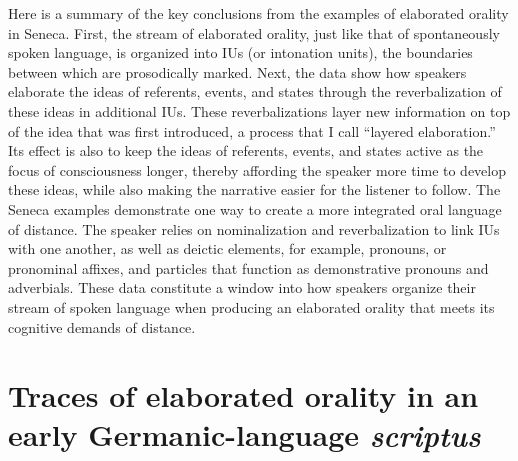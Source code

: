 Here is a summary of the key conclusions from the examples of elaborated orality in Seneca. First, the stream of elaborated orality, just like that of spontaneously spoken language, is organized into IUs (or intonation units), the boundaries between which are prosodically marked. Next, the data show how speakers elaborate the ideas of referents, events, and states through the reverbalization of these ideas in additional IUs. These reverbalizations layer new information on top of the idea that was first introduced, a process that I call “layered elaboration.” Its effect is also to keep the ideas of referents, events, and states active as the focus of consciousness longer, thereby affording the speaker more time to develop these ideas, while also making the narrative easier for the listener to follow. The Seneca examples demonstrate one way to create a more integrated oral language of distance. The speaker relies on nominalization and reverbalization to link IUs with one another, as well as deictic elements, for example, pronouns, or pronominal affixes, and particles that function as demonstrative pronouns and adverbials. These data constitute a window into how speakers organize their stream of spoken language when producing an elaborated orality that meets its cognitive demands of distance.

\section{Traces of elaborated orality in an early Germanic-language \textit{scriptus}}\label{sec:6.2}

